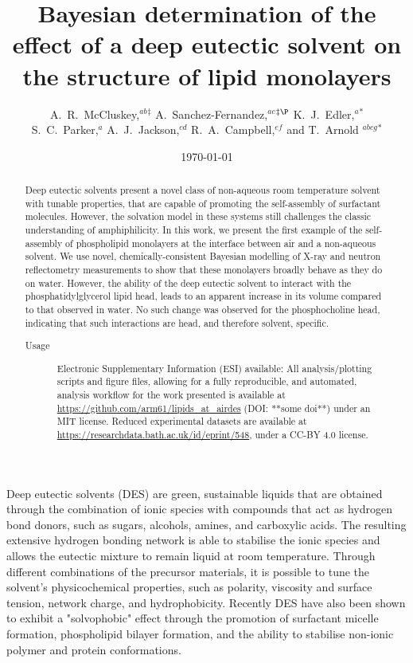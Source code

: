 \documentclass[twocolumn,a4paper]{paper}
\title{Bayesian determination of the effect of a deep eutectic solvent on the structure of lipid monolayers}
\author{A.~R.~McCluskey,\textit{$^{ab}$}$^{\ddag}$ A.~Sanchez-Fernandez,\textit{$^{ac}$}$^{\ddag\P}$ K.~J.~Edler,\textit{$^{a}$}$^{\ast}$ \\
S.~C.~Parker,\textit{$^{a}$} A.~J.~Jackson,\textit{$^{cd}$} R.~A.~Campbell,\textit{$^{ef}$} and T.~Arnold \textit{$^{abcg}$}$^{\ast}$}
\date{\today}
\begin{document}
\maketitle

\begin{abstract}
Deep eutectic solvents present a novel class of non-aqueous room temperature solvent with tunable properties, that are capable of promoting the self-assembly of surfactant molecules.
However, the solvation model in these systems still challenges the classic understanding of amphiphilicity.
In this work, we present the first example of the self-assembly of phospholipid monolayers at the interface between air and a non-aqueous solvent.
We use novel, chemically-consistent Bayesian modelling of X-ray and neutron reflectometry measurements to show that these monolayers broadly behave as they do on water.
However, the ability of the deep eutectic solvent to interact with the phosphatidylglycerol lipid head, leads to an apparent increase in its volume compared to that observed in water.
No such change was observed for the phosphocholine head, indicating that such interactions are head, and therefore solvent, specific.
\begin{description}
\item[Usage]
Electronic Supplementary Information (ESI) available: All analysis/plotting scripts and figure files, allowing for a fully reproducible, and automated, analysis workflow for the work presented is available at \url{https://github.com/arm61/lipids_at_airdes} (DOI: **some doi**) under an MIT license. Reduced experimental datasets are available at \url{https://researchdata.bath.ac.uk/id/eprint/548}, under a CC-BY 4.0 license.
\end{description}
\end{abstract}


Deep eutectic solvents (DES) are green, sustainable liquids that are obtained through the combination of ionic species with compounds that act as hydrogen bond donors, such as sugars, alcohols, amines, and carboxylic acids\cite{Smith2014,Dai2013,Jiang2018}.
The resulting extensive hydrogen bonding network is able to stabilise the ionic species and allows the eutectic mixture to remain liquid at room temperature\cite{Hammond2016,Hammond2017,Araujo2017}.
Through different combinations of the precursor materials, it is possible to tune the solvent's physicochemical properties, such as polarity\cite{Pandey2014}, viscosity and surface tension\cite{Smith2014}, network charge\cite{Zahn2016}, and hydrophobicity\cite{Ribeiro2015,vanOsch2015}.
Recently DES have also been shown to exhibit a "solvophobic" effect through the promotion of surfactant micelle formation\cite{Sanchez-Fernandez2016,Arnold2015,Hsieh2018,Banjare2018}, phospholipid bilayer formation\cite{Bryant2017,Bryant2016,Gutierrez2009}, and the ability to stabilise non-ionic polymer\cite{Sapir2016} and protein conformations\cite{Sanchez-Fernandez2017}.
\end{document}
